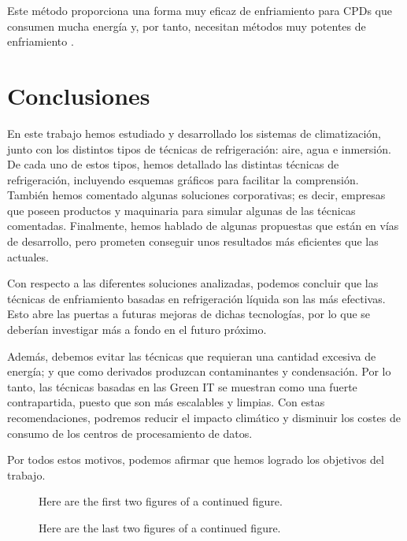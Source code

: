 Este método proporciona una forma muy eficaz de enfriamiento para CPDs que consumen mucha energía y, por tanto, necesitan métodos muy potentes de enfriamiento \cite{datacenters-future}.



\chapter{Conclusiones}

En este trabajo hemos estudiado y desarrollado los sistemas de climatización, junto con los distintos tipos de técnicas de refrigeración: aire, agua e inmersión. De cada uno de estos tipos, hemos detallado las distintas técnicas de refrigeración, incluyendo esquemas gráficos para facilitar la comprensión. También hemos comentado algunas soluciones corporativas; es decir, empresas que poseen productos y maquinaria para simular algunas de las técnicas comentadas. Finalmente, hemos hablado de algunas propuestas que están en vías de desarrollo, pero prometen conseguir unos resultados más eficientes que las actuales.

Con respecto a las diferentes soluciones analizadas, podemos concluir que las técnicas de enfriamiento basadas en refrigeración líquida son las más efectivas. Esto abre las puertas a futuras mejoras de dichas tecnologías, por lo que se deberían investigar más a fondo en el futuro próximo.

Además, debemos evitar las técnicas que requieran una cantidad excesiva de energía; y que como derivados produzcan contaminantes y condensación. Por lo tanto, las técnicas basadas en las Green IT se muestran como una fuerte contrapartida, puesto que son más escalables y limpias. Con estas recomendaciones, podremos reducir el impacto climático y disminuir los costes de consumo de los centros de procesamiento de datos.

Por todos estos motivos, podemos afirmar que hemos logrado los objetivos del trabajo.

\begin{figure}%
    \centering
    \qquad
    \caption{Here are the first two figures of a continued figure.}%
    \label{fig:cont}%
\end{figure}

\begin{figure}%
    \ContinuedFloat
    \centering
    \qquad
    \caption[]{Here are the last two figures of a continued figure.}%
    \label{fig:cont}%
\end{figure}